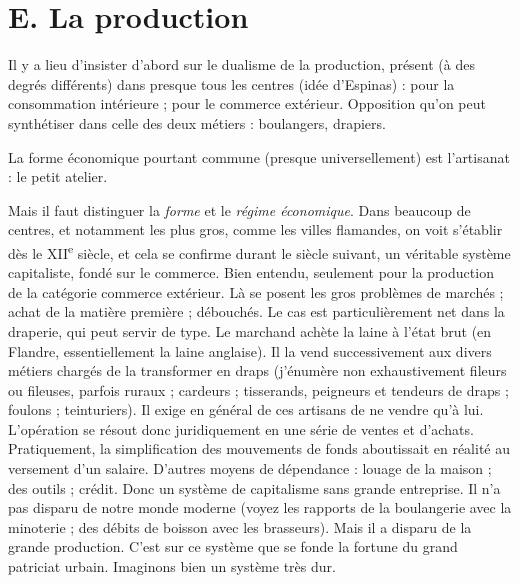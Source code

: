 \documentclass[french,twoside]{book} %
\begin{document}
\section[E. La production]{E. La production}
\label{c09e}
\noindent Il y a lieu d’insister d’abord sur le dualisme de la production, présent (à des degrés différents) dans presque tous les centres (idée d’Espinas) : pour la consommation intérieure ; pour le commerce extérieur. Opposition qu’on peut synthétiser dans celle des deux métiers : boulangers, drapiers.\par
La forme économique pourtant commune (presque universellement) est l’artisanat : le petit atelier.\par
Mais il faut distinguer la \emph{forme} et le \emph{régime économique}. Dans beaucoup de centres, et notamment les plus gros, comme les villes flamandes, on voit s’établir dès le XII\textsuperscript{e} siècle, et cela se confirme durant le siècle suivant, un véritable système capitaliste, fondé sur le commerce. Bien entendu, seulement pour la production de la catégorie commerce extérieur. Là se posent les gros problèmes de marchés ; achat de la matière première ; débouchés. Le cas est particulièrement net dans la draperie, qui peut servir de type. Le marchand achète la laine à l’état brut (en Flandre, essentiellement la laine anglaise). Il la vend successivement aux divers métiers  
\label{p96} chargés de la transformer en draps (j’énumère non exhaustivement fileurs ou fileuses, parfois ruraux ; cardeurs ; tisserands, peigneurs et tendeurs de draps ; foulons ; teinturiers). Il exige en général de ces artisans de ne vendre qu’à lui. L’opération se résout donc juridiquement en une série de ventes et d’achats. Pratiquement, la simplification des mouvements de fonds aboutissait en réalité au versement d’un salaire. D’autres moyens de dépendance : louage de la maison ; des outils ; crédit. Donc un système de capitalisme sans grande entreprise. Il n’a pas disparu de notre monde moderne (voyez les rapports de la boulangerie avec la minoterie ; des débits de boisson avec les brasseurs). Mais il a disparu de la grande production. C’est sur ce système que se fonde la fortune du grand patriciat urbain. Imaginons bien un système très dur.\par
\end{document}
